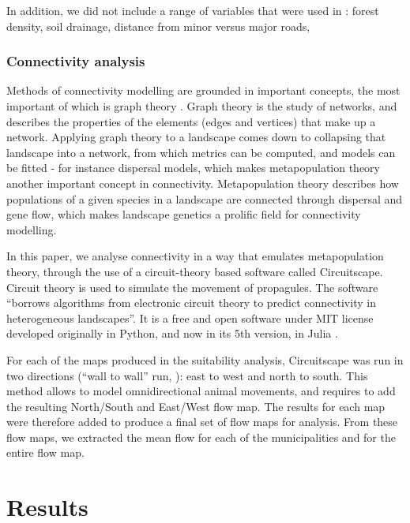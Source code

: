 In addition, we did not include a range of variables that were used in \citeauthor{rayfield_priorisation_2018}: forest density, soil drainage, distance from minor versus major roads,   \\

\subsubsection{Connectivity analysis}

Methods of connectivity modelling are grounded in important concepts, the most important of which is graph theory \citep{dale_graphs_2010}. Graph theory is the study of networks, and describes the properties of the elements (edges and vertices) that make up a network. Applying graph theory to a landscape comes down to collapsing that landscape into a network, from which metrics can be computed, and models can be fitted - for instance dispersal models, which makes metapopulation theory another important concept in connectivity\citep{hanski_habitat_1999}. Metapopulation theory describes how populations of a given species in a landscape are connected through dispersal and gene flow, which makes landscape genetics a prolific field for connectivity modelling.

In this paper, we analyse connectivity in a way that emulates metapopulation theory, through the use of a circuit-theory based software called Circuitscape. Circuit theory is used to simulate the movement of propagules. The software “borrows algorithms from electronic circuit theory to predict connectivity in heterogeneous landscapes”. It is a free and open software under MIT license developed originally in Python, and now in its 5th version, in Julia \citep{circuitjulia}. 

For each of the maps produced in the suitability analysis, Circuitscape was run in two directions (“wall to wall” run, \cite{mcrae_conserving_2016}): east to west and north to south. This method allows to model omnidirectional animal movements, and requires to add the resulting North/South and East/West flow map. The results for each map were therefore added to produce a final set of flow maps for analysis. From these flow maps, we extracted the mean flow for each of the municipalities and for the entire flow map. \\

\section{Results}

